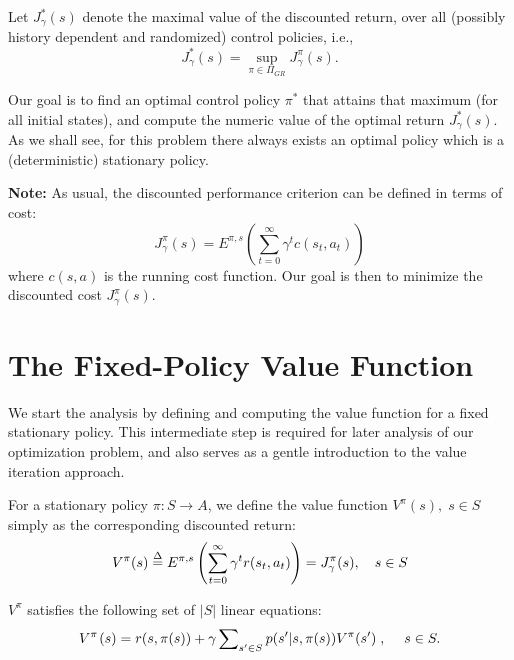 Let $J_\gamma ^*(s)$ denote the maximal value of the discounted return, over all (possibly history dependent and randomized) control policies, i.e.,
\[J_\gamma ^*(s) = \mathop {\sup }\limits_{\pi  \in {\Pi _{GR}}} J_\gamma ^\pi (s).\]


Our goal is to find an optimal control policy ${\pi ^*}$ that attains that maximum (for all initial states), and compute the numeric value of the optimal return $J_\gamma ^*(s)$.
As we shall see, for this problem there always exists an optimal policy which is a  (deterministic) stationary policy.

\textbf{Note:} As usual, the discounted performance criterion can be defined in terms of cost:
\[J_\gamma ^\pi (s) = {E^{\pi ,s}}(\sum\limits_{t = 0}^\infty  {{\gamma ^t}c({s_t},{a_t})} )\]
where $c(s,a)$ is the running cost function. Our goal is then to minimize the discounted cost $J_\gamma ^\pi (s)$.


\section{The Fixed-Policy Value Function}\label{s:FP_VF}

We start the analysis by defining and computing the value function for a fixed stationary policy. This intermediate step is required for later analysis of our optimization problem,  and also serves as a gentle introduction to the value iteration approach.

For a stationary policy $\pi :S \to A$, we define the value function $V_{}^\pi (s),\;s \in S$ simply as the corresponding discounted return:
\[V_{}^\pi (s) \buildrel \Delta \over = {E^{\pi ,s}}\left(\sum\limits_{t = 0}^\infty  {{\gamma ^t}r({s_t},{a_t})} \right)=J_\gamma ^\pi (s),   \quad s \in  S\]

\begin{lemma}\label{lem:FP_Bellman} $V_{}^\pi $ satisfies the following set of $|S|$ linear equations:
\begin{equation}\label{eq:FP_Bellman}
{V^\pi }{\kern 1pt} (s) = r(s,\pi (s)) + \gamma \sum\nolimits_{s' \in S} {p(s'|s,\pi (s)){V^\pi }(s')} \;,\quad \;s \in S.
\end{equation}
\end{lemma}

